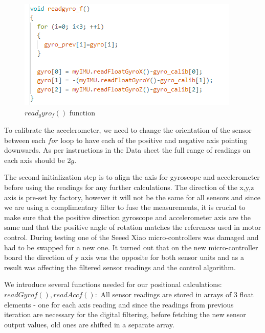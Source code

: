 \begin{figure}[H]
    \begin{center}
    \includegraphics[scale = 0.85]{pictures/IMU/read_gyro_f.png}
    \end{center}
    \caption{$read_gyro_f()$ function}
    \label{fig:my_label}
\end{figure}


To calibrate the accelerometer, we need to change the orientation of the sensor between each $for$ loop to have each of the positive and negative axis pointing downwards. As per instructions in the Data sheet the full range of readings on each axis should be 2$g$. 

The second initialization step is to align the axis for gyroscope and accelerometer before using the readings for any further calculations.
The direction of the x,y,z axis is pre-set by factory, however it will not be the same for all sensors and since we are using a complimentary filter to fuse the measurements, it is crucial to make sure that the positive direction gyroscope and accelerometer axis are the same and that the positive angle of rotation matches the references used in motor control. \newline
During testing one of the Seeed Xiao micro-controllers was damaged and had to be swapped for a new one. It turned out that on the new micro-controller board the direction of y axis was the opposite for both sensor units and as a result was affecting the filtered sensor readings and the control algorithm. \newline

We introduce several functions needed for our positional calculations:
$readGyrof(), readAccf():$\newline
All sensor readings are stored in arrays of 3 float elements - one for each axis reading and since the readings from previous iteration are necessary for the digital filtering, before fetching the new sensor output values, old ones are shifted in a separate array.

